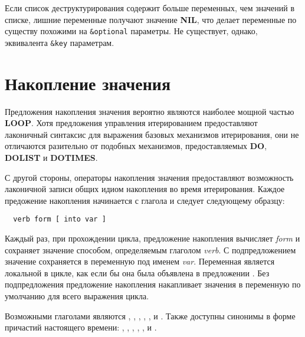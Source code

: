 Если список деструктурирования содержит больше переменных, чем значений в списке, лишние
переменные получают значение \textbf{NIL}, что делает переменные по существу похожими на
\lstinline!&optional! параметры. Не существует, однако, эквивалента \lstinline!&key!
параметрам.

\section{Накопление значения}

Предложения накопления значения вероятно являются наиболее мощной частью
\textbf{LOOP}. Хотя предложения управления итерированием предоставляют лаконичный
синтаксис для выражения базовых механизмов итерирования, они не отличаются разительно от
подобных механизмов, предоставляемых \textbf{DO}, \textbf{DOLIST} и \textbf{DOTIMES}.

С другой стороны, операторы накопления значения предоставляют возможность лаконичной
записи общих идиом накопления во время итерирования. Каждое предожение накопления
начинается с глагола и следует следующему образцу:

\begin{verbatim}
  verb form [ into var ]
\end{verbatim}

Каждый раз, при прохождении цикла, предложение накопления вычисляет \textit{form} и
сохраняет значение способом, определяемым глаголом \textit{verb}. С подпредложением
 значение сохраняется в переменную под именем \textit{var}. Переменная является
локальной в цикле, как если бы она была объявлена в предложении . Без
подпредложения  предложение накопления накапливает значения в переменную по
умолчанию для всего выражения цикла.

Возможными глаголами являются , , , ,
,  и . Также доступны синонимы в форме причастий
настоящего времени: , , , ,
,  и .

